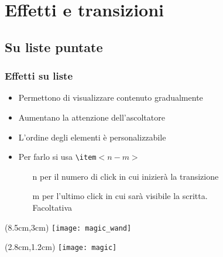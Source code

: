 \section{Effetti e transizioni}
\subsection{Su liste puntate}
\begin{frame}
  \frametitle{Effetti su liste}
  
  \begin{itemize}
   \item<1-3> Permettono di visualizzare contenuto gradualmente
   \item<2-> Aumentano la attenzione dell'ascoltatore
   \item<4-> L'ordine degli elementi è personalizzabile
   \item<3-> Per farlo si usa \texttt{\textbackslash item}$<n - m>$
   \begin{itemize}
    \item[n] per il numero di click in cui inizierà la transizione
    \item[m] per l'ultimo click in cui sarà visibile la scritta. \\ Facoltativa
   \end{itemize}

  \end{itemize}
  
  
 \begin{textblock*}{5cm}(8.5cm,3cm)
    \texttt{[image: magic\_wand]}
  \end{textblock*}
  
  
 \begin{textblock*}{5cm}(2.8cm,1.2cm)
    \texttt{[image: magic]}
  \end{textblock*}

\end{frame}
 
